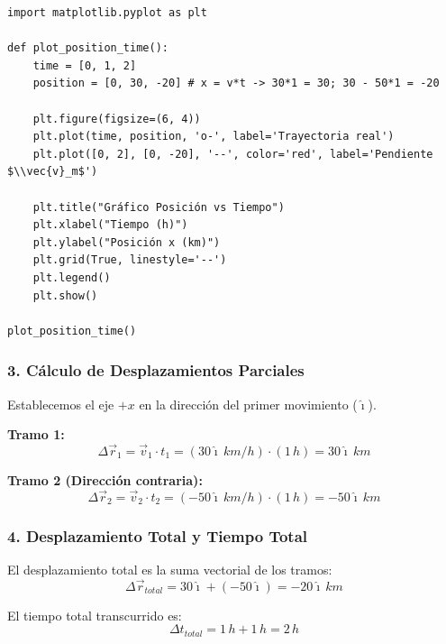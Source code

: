 \documentclass[12pt, a4paper]{article}
\begin{document}
\begin{lstlisting}
import matplotlib.pyplot as plt

def plot_position_time():
    time = [0, 1, 2]
    position = [0, 30, -20] # x = v*t -> 30*1 = 30; 30 - 50*1 = -20
    
    plt.figure(figsize=(6, 4))
    plt.plot(time, position, 'o-', label='Trayectoria real')
    plt.plot([0, 2], [0, -20], '--', color='red', label='Pendiente $\\vec{v}_m$')
    
    plt.title("Gráfico Posición vs Tiempo")
    plt.xlabel("Tiempo (h)")
    plt.ylabel("Posición x (km)")
    plt.grid(True, linestyle='--')
    plt.legend()
    plt.show()

plot_position_time()
\end{lstlisting}

\subsubsection*{3. Cálculo de Desplazamientos Parciales}

Establecemos el eje $+x$ en la dirección del primer movimiento ($\hat{\imath}$).

\textbf{Tramo 1:}
\begin{equation}
    \Delta \vec{r}_1 = \vec{v}_1 \cdot t_1 = (30 \hat{\imath} \, \si{km/h}) \cdot (1 \, \si{h}) = 30 \hat{\imath} \, \si{km}
\end{equation}

\textbf{Tramo 2 (Dirección contraria):}
\begin{equation}
    \Delta \vec{r}_2 = \vec{v}_2 \cdot t_2 = (-50 \hat{\imath} \, \si{km/h}) \cdot (1 \, \si{h}) = -50 \hat{\imath} \, \si{km}
\end{equation}

\subsubsection*{4. Desplazamiento Total y Tiempo Total}

El desplazamiento total es la suma vectorial de los tramos:
\begin{equation}
    \Delta \vec{r}_{total} = 30 \hat{\imath} + (-50 \hat{\imath}) = -20 \hat{\imath} \, \si{km}
\end{equation}

El tiempo total transcurrido es:
\begin{equation}
    \Delta t_{total} = 1 \, \si{h} + 1 \, \si{h} = 2 \, \si{h}
\end{equation}
\end{document}
